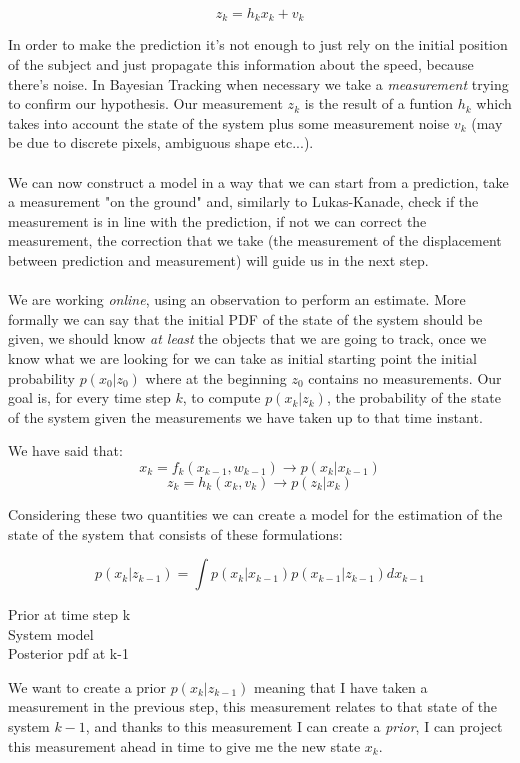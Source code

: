 \[
    z_k = h_k x_k + v_k
\]

In order to make the prediction it's not enough to just rely on the initial position of the subject and just propagate this information about the speed, because there's noise. In Bayesian Tracking when necessary we take a \textit{measurement} trying to confirm our hypothesis. Our measurement $z_k$ is the result of a funtion $h_k$ which takes into account the state of the system plus some measurement noise $v_k$ (may be due to discrete pixels, ambiguous shape etc...).
\\
\\
We can now construct a model in a way that we can start from a prediction, take a measurement "on the ground" and, similarly to Lukas-Kanade, check if the measurement is in line with the prediction, if not we can correct the measurement, the correction that we take (the measurement of the displacement between prediction and measurement) will guide us in the next step.
\\
\\
We are working \textit{online}, using an observation to perform an estimate. More formally we can say that the initial PDF of the state of the system should be given, we should know \textit{at least} the objects that we are going to track, once we know what we are looking for we can take as initial starting point the initial probability $p(x_0|z_0)$ where at the beginning $z_0$ contains no measurements. Our goal is,  for every time step $k$, to compute $p(x_k|z_k)$, the probability of the state of the system given the measurements we have taken up to that time instant.


We have said that:
\[
    x_k = f_k(x_{k-1}, w_{k-1}) \rightarrow p(x_k|x_{k-1})
\]
\[
    z_k = h_k(x_k, v_k) \rightarrow p(z_k|x_k)
\]

Considering these two quantities we can create a model for the estimation of the state of the system that consists of these formulations:

\[
    p(x_k|z_{k-1}) = \int p(x_k|x_{k-1})p(x_{k-1}|z_{k-1})dx_{k-1}
\]

\begin{multicols}{3}
    Prior at time step k\\
    System model\\
    Posterior pdf at k-1
\end{multicols}

We want to create a prior $p(x_k|z_{k-1})$ meaning that I have taken a measurement in the previous step, this measurement relates to that state of the system $k-1$, and thanks to this measurement I can create a \textit{prior}, I can project this measurement ahead in time to give me the new state $x_k$.

